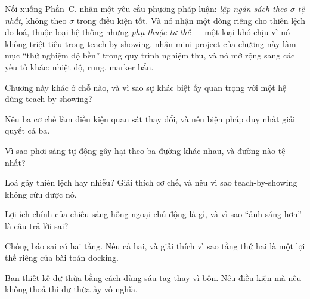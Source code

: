 \documentclass[../../marker.tex]{subfiles}
\begin{document}
Nối xuống Phần~C.  nhận một yêu cầu phương pháp luận: \emph{lập ngân sách theo \(\sigma\) tệ nhất}, không theo \(\sigma\) trong điều kiện tốt. Và nó nhận một dòng riêng cho thiên lệch do loá, thuộc loại hệ thống nhưng \emph{phụ thuộc tư thế} --- một loại khó chịu vì nó không triệt tiêu trong teach-by-showing.  nhận mini project của chương này làm mục ``thử nghiệm độ bền'' trong quy trình nghiệm thu, và nó mở rộng sang các yếu tố khác: nhiệt độ, rung, marker bẩn.

\begin{tukiem}
\item Chương này khác  ở chỗ nào, và vì sao sự khác biệt ấy quan trọng với một hệ dùng teach-by-showing?
\item Nêu ba cơ chế làm điều kiện quan sát thay đổi, và nêu biện pháp duy nhất giải quyết cả ba.
\item Vì sao phơi sáng tự động gây hại theo ba đường khác nhau, và đường nào tệ nhất?
\item Loá gây thiên lệch hay nhiễu? Giải thích cơ chế, và nêu vì sao teach-by-showing không cứu được nó.
\item Lợi ích chính của chiếu sáng hồng ngoại chủ động là gì, và vì sao ``ảnh sáng hơn'' là câu trả lời sai?
\item Chống báo sai có hai tầng. Nêu cả hai, và giải thích vì sao tầng thứ hai là một lợi thế riêng của bài toán docking.
\item Bạn thiết kế dư thừa bằng cách dùng sáu tag thay vì bốn. Nêu điều kiện mà nếu không thoả thì dư thừa ấy vô nghĩa.
\end{tukiem}
\ifSubfilesClassLoaded{\printbibliography[title={Nguồn}]}{}
\end{document}
